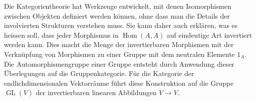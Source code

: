 Die Kategorientheorie hat Werkzeuge entwickelt, mit denen Isomorphismen
zwischen Objekten definiert werden können, ohne dass man die Details der
involvierten Strukturen verstehen muss.
Sie kann daher auch erklären, was es heissen soll, dass jeder 
Morphismus in $\operatorname{Hom}(A,A)$ auf eindeutige Art invertiert
werden kann.
Dies macht die Menge der invertierbaren Morphismen mit der Verknüpfung
von Morphismen zu einer Gruppe mit dem neutralen Elemente $1_A$.
Die Automorphismengruppe einer Gruppe entsteht durch Anwendung dieser
Überlegungen auf die Gruppenkategorie.
Für die Kategorie der endlichdimensionalen Vektorräume
führt diese Konstruktion auf die Gruppe $\operatorname{GL}(V)$ der
invertierbaren linearen Abbildungen $V\to V$.


